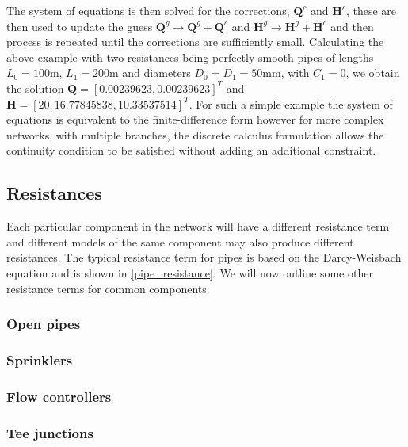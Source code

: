 The system of equations is then solved for the corrections, $\mathbf{Q}^c$ and $\mathbf{H}^c$, these are then used to update the guess $\mathbf{Q}^g \rightarrow \mathbf{Q}^g + \mathbf{Q}^c $ and $\mathbf{H}^g \rightarrow \mathbf{H}^g + \mathbf{H}^c $ and then process is repeated until the corrections are sufficiently small. Calculating the above example with two resistances being perfectly smooth pipes of lengths $L_0 = 100$m, $L_1 = 200$m and diameters $D_0=D_1=50$mm, with $C_1=0$, we obtain the solution $\mathbf{Q} = [0.00239623, 0.00239623]^T$ and $\mathbf{H} = [20, 16.77845838, 10.33537514]^T$. For such a simple example the system of equations is equivalent to the finite-difference form however for more complex networks, with multiple branches, the discrete calculus formulation allows the continuity condition to be satisfied without adding an additional constraint. 

\subsection{Resistances}

Each particular component in the network will have a different resistance term and different models of the same component may also produce different resistances. The typical resistance term for pipes is based on the Darcy-Weisbach equation and is shown in \eqref{pipe_resistance}. We will now outline some other resistance terms for common components. 






\subsubsection{Open pipes}

\subsubsection{Sprinklers}

\subsubsection{Flow controllers}

\subsubsection{Tee junctions}

